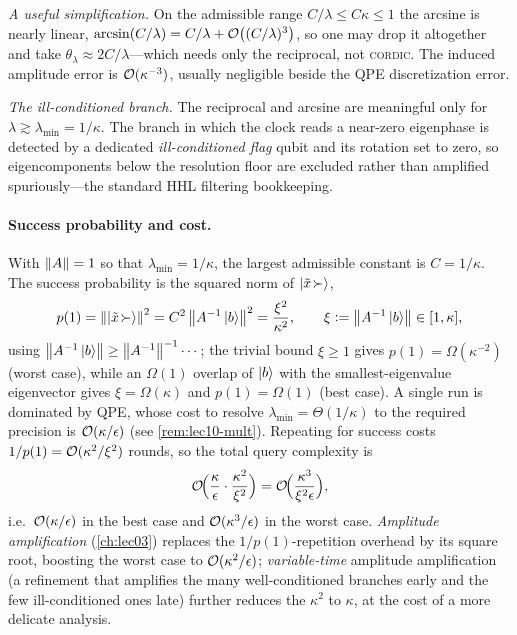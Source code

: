 \begin{remark}
\emph{A useful simplification.} On the admissible range $C/\lambda\le C\kappa\le1$ the
arcsine is nearly linear, $\arcsin(C/\lambda)=C/\lambda+\mathcal{O}\bigl((C/\lambda)^3\bigr)$, so
one may drop it altogether and take $\theta_\lambda\approx2C/\lambda$---which needs only
the reciprocal, not \textsc{cordic}. The induced amplitude error is $\mathcal{O}(\kappa^{-3})$,
usually negligible beside the QPE discretization error.

\emph{The ill-conditioned branch.} The reciprocal and arcsine are meaningful only for
$\lambda\gtrsim\lambda_{\min}=1/\kappa$. The branch in which the clock reads a near-zero
eigenphase is detected by a dedicated \emph{ill-conditioned flag} qubit and its rotation
set to zero, so eigencomponents below the resolution floor are excluded rather than
amplified spuriously---the standard HHL filtering bookkeeping.
\end{remark}

\paragraph{Success probability and cost.}
With $\left\lVert A \right\rVert=1$ so that $\lambda_{\min}=1/\kappa$, the largest admissible constant is
$C=1/\kappa$. The success probability is the squared norm of $\ket{\tilde x\!\succ}$,
\begin{equation}
  p(1)=\left\lVert \ket{\tilde x\!\succ} \right\rVert^2=C^2\left\lVert A^{-1}\ket b \right\rVert^2
      =\frac{\xi^2}{\kappa^2},\qquad \xi\vcentcolon=\left\lVert A^{-1}\ket b \right\rVert\in[1,\kappa],
  \label{eq:lec10-hhl-prob}
\end{equation}
using $\left\lVert A^{-1}\ket b \right\rVert\ge\left\lVert A^{-1} \right\rVert^{-1}\cdots$; the trivial bound $\xi\ge1$
gives $p(1)=\Omega(\kappa^{-2})$ (worst case), while an $\Omega(1)$ overlap of $\ket b$
with the smallest-eigenvalue eigenvector gives $\xi=\Omega(\kappa)$ and $p(1)=\Omega(1)$
(best case). A single run is dominated by QPE, whose cost to resolve $\lambda_{\min}
=\Theta(1/\kappa)$ to the required precision is $\mathcal{O}(\kappa/\epsilon)$ (see
\cref{rem:lec10-mult}). Repeating for success costs $1/p(1)=\mathcal{O}(\kappa^2/\xi^2)$
rounds, so the total query complexity is
\begin{equation}
  \mathcal{O}\!\Bigl(\frac{\kappa}{\epsilon}\cdot\frac{\kappa^2}{\xi^2}\Bigr)
  =\mathcal{O}\!\Bigl(\frac{\kappa^3}{\xi^2\epsilon}\Bigr),
  \label{eq:lec10-hhl-cost}
\end{equation}
i.e.\ $\mathcal{O}(\kappa/\epsilon)$ in the best case and $\mathcal{O}(\kappa^3/\epsilon)$ in the
worst case. \emph{Amplitude amplification} (\cref{ch:lec03}) replaces the
$1/p(1)$-repetition overhead by its square root, boosting the worst case to
$\mathcal{O}(\kappa^2/\epsilon)$; \emph{variable-time} amplitude amplification (a refinement
that amplifies the many well-conditioned branches early and the few ill-conditioned
ones late) further reduces the $\kappa^2$ to $\kappa$, at the cost of a more delicate
analysis.

